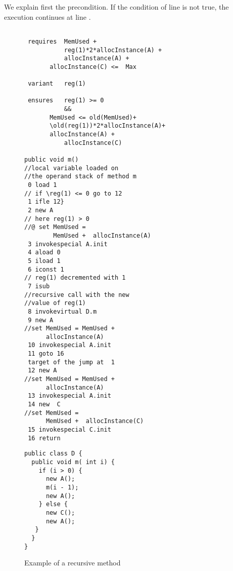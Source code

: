 We explain first the precondition. If the condition of line  is not true, the execution continues at line .

\begin{figure}[!hbp]

\begin{minipage}[t]{90mm}
\begin{lstlisting}[frame=trbl]

 requires  MemUsed +
           reg(1)*2*allocInstance(A) + 
           allocInstance(A) +
	   allocInstance(C) <=  Max 

 variant   reg(1) 

 ensures   reg(1) >= 0 
           &&
	   MemUsed <= old(MemUsed)+  
	   \old(reg(1))*2*allocInstance(A)+
	   allocInstance(A) + 
           allocInstance(C)
 
public void m()
//local variable loaded on 
//the operand stack of method m
 0 load 1
// if \reg(1) <= 0 go to 12
 1 ifle 12}
 2 new A 
// here reg(1) > 0 
//@ set MemUsed =
        MemUsed +  allocInstance(A)
 3 invokespecial A.init
 4 aload 0
 5 iload 1
 6 iconst 1
// reg(1) decremented with 1
 7 isub
//recursive call with the new 
//value of reg(1)
 8 invokevirtual D.m
 9 new A
//set MemUsed = MemUsed + 
      allocInstance(A)
 10 invokespecial A.init
 11 goto 16
 target of the jump at  1
 12 new A
//set MemUsed = MemUsed + 
      allocInstance(A)
 13 invokespecial A.init
 14 new  C
//set MemUsed =
      MemUsed +  allocInstance(C)
 15 invokespecial C.init
 16 return
\end{lstlisting} 
\end{minipage}

\phantom{aaaaa}

\begin{minipage}[t]{90mm}
\begin{lstlisting}[frame=trbl]
public class D {
  public void m( int i) {
    if (i > 0) {
      new A();
      m(i - 1);
      new A();
    } else {
      new C();
      new A();
   }
  }
}
\end{lstlisting} 
\end{minipage}
\caption{\sc Example of a recursive method}
 \label{recMeth}
\end{figure}

